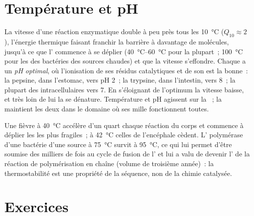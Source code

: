 \section{Température et pH}

\begin{proposition}\label{prop:b1:enzymes:environment}
La vitesse d'une réaction enzymatique double à peu près tous les
\qty{10}{\celsius} ($Q_{10} \approx 2$), l'énergie thermique faisant
franchir la barrière à davantage de molécules, jusqu'à ce que l'
commence à se déplier (\qtyrange{40}{60}{\celsius} pour la plupart~;
\qty{100}{\celsius} pour les  des bactéries des sources chaudes)
et que la vitesse s'effondre. Chaque  a un \emph{pH optimal}, où
l'ionisation de ses résidus catalytiques et de son  est la
bonne~: la pepsine, dans l'estomac, vers pH 2~; la trypsine, dans
l'intestin, vers 8~; la plupart des  intracellulaires vers 7. En
s'éloignant de l'optimum la vitesse baisse, et très loin de lui la
 se dénature. Température et pH agissent sur la ~; la
 maintient les deux dans le domaine où ses mille 
fonctionnent toutes.
\end{proposition}

\begin{example}\label{ex:b1:enzymes:fever}
Une fièvre à \qty{40}{\celsius} accélère d'un quart chaque réaction du
corps et commence à déplier les  les plus fragiles~; à
\qty{42}{\celsius} celles de l'encéphale cèdent. L' polymérase d'une
bactérie d'une source à \qty{75}{\celsius} survit à \qty{95}{\celsius},
ce qui lui permet d'être soumise des milliers de fois au cycle de fusion
de l' et lui a valu de devenir l' de la réaction de
polymérisation en chaîne (volume de troisième année)~: la
thermostabilité est une propriété de la séquence, non de la chimie
catalysée.
\end{example}

\section{Exercices}

